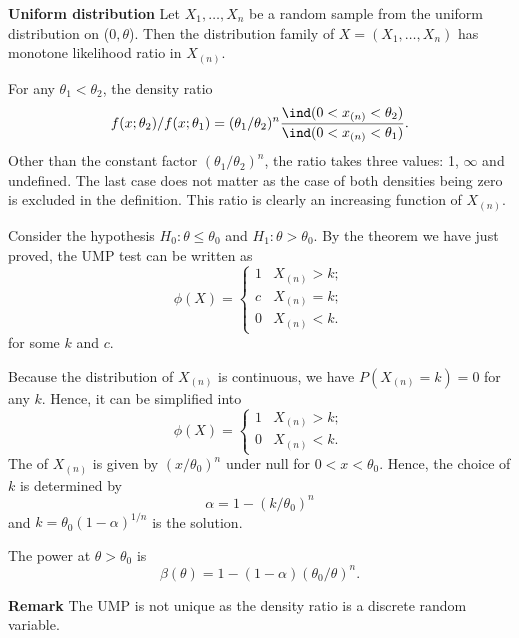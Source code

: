 \begin{example}
{\bf Uniform distribution}
Let $X_1, \ldots, X_n$ be a random sample
from the uniform distribution on ($0, \theta$).
Then the distribution family of $X = (X_1, \ldots, X_n)$
has monotone likelihood ratio in $X_{(n)}$.

For any $\theta_1 < \theta_2$, the density ratio
\[
f(x; \theta_2)/f(x; \theta_1) 
= (\theta_1/\theta_2)^n 
\frac{\ind (0 < x_{(n)} < \theta_2)}{\ind (0 < x_{(n)} < \theta_1)}.
\]
Other than the constant factor $(\theta_1/\theta_2)^n$,
the ratio takes three values: 1, $\infty$ and undefined.
The last case does not matter as the case of both densities being zero
is excluded in the definition. This ratio is clearly an increasing function
of $X_{(n)}$.

Consider the hypothesis $H_0: \theta \leq \theta_0$
and $H_1: \theta > \theta_0$. By the theorem we have
just proved, the UMP test can be written
as
\[
\phi(X) =
\left \{
\begin{array}{ll}
1 & X_{(n)} > k;\\
c  & X_{(n)}  = k;\\
0 & X_{(n)}  < k.
\end{array}
\right .
\]
for some $k$ and $c$. 

Because the distribution of $X_{(n)}$ is continuous,
we have $P(X_{(n)}  = k) = 0$ for any $k$.
Hence, it can be simplified into
\[
\phi(X) =
\left \{
\begin{array}{ll}
1 & X_{(n)} > k;\\
0 & X_{(n)}  < k.
\end{array}
\right .
\]
The \cdf of $X_{(n)}$ is given by $(x/\theta_0)^n$ under null
for $0 < x < \theta_0$.
Hence, the choice of $k$ is determined by
\[
\alpha = 1 - (k/\theta_0)^n
\]
and $k = \theta_0 (1 - \alpha)^{1/n}$ is the solution.

The power at $\theta > \theta_0$ is
\[
\beta(\theta) = 1 - (1-\alpha)(\theta_0/\theta)^n.
\]
\end{example}

{\bf Remark} The UMP is not unique as the density ratio
is a discrete random variable.
